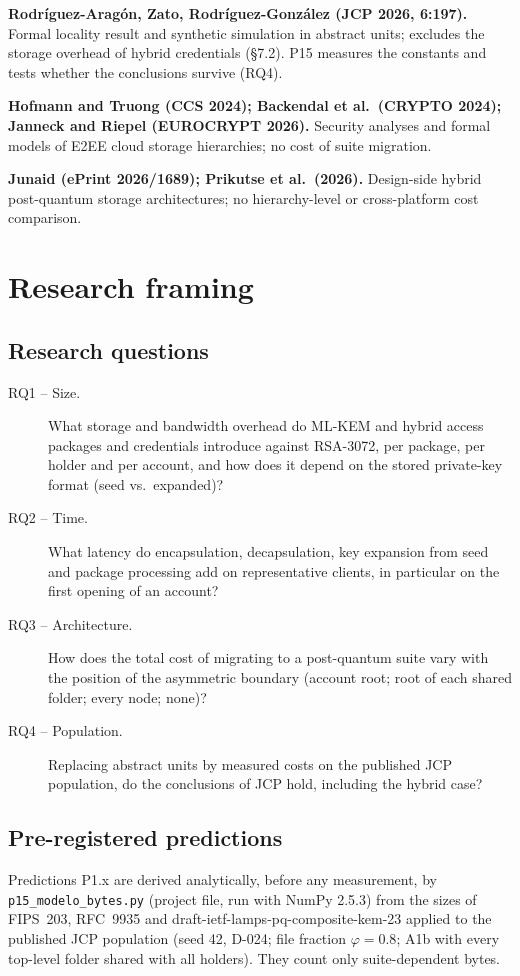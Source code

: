 \documentclass[11pt,a4paper]{article}
\begin{document}
\textbf{Rodríguez-Aragón, Zato, Rodríguez-González (JCP 2026, 6:197).} Formal locality result and synthetic simulation in abstract units; excludes the storage overhead of hybrid credentials (\S7.2). P15 measures the constants and tests whether the conclusions survive (RQ4).

\textbf{Hofmann and Truong (CCS 2024); Backendal et al.\ (CRYPTO 2024); Janneck and Riepel (EUROCRYPT 2026).} Security analyses and formal models of E2EE cloud storage hierarchies; no cost of suite migration.

\textbf{Junaid (ePrint 2026/1689); Prikutse et al.\ (2026).} Design-side hybrid post-quantum storage architectures; no hierarchy-level or cross-platform cost comparison.

\section{Research framing}
\subsection{Research questions}
\begin{description}
\item[RQ1 -- Size.] What storage and bandwidth overhead do ML-KEM and hybrid access packages and credentials introduce against RSA-3072, per package, per holder and per account, and how does it depend on the stored private-key format (seed vs.\ expanded)?
\item[RQ2 -- Time.] What latency do encapsulation, decapsulation, key expansion from seed and package processing add on representative clients, in particular on the first opening of an account?
\item[RQ3 -- Architecture.] How does the total cost of migrating to a post-quantum suite vary with the position of the asymmetric boundary (account root; root of each shared folder; every node; none)?
\item[RQ4 -- Population.] Replacing abstract units by measured costs on the published JCP population, do the conclusions of JCP hold, including the hybrid case?
\end{description}

\subsection{Pre-registered predictions}\label{sec:predictions}
Predictions P1.x are derived analytically, before any measurement, by \texttt{p15\_\allowbreak{}modelo\_\allowbreak{}bytes.py} (project file, run with NumPy 2.5.3) from the sizes of FIPS~203, RFC~9935 and draft-ietf-lamps-pq-composite-kem-23 applied to the published JCP population (seed 42, D-024; file fraction $\varphi=0.8$; A1b with every top-level folder shared with all holders). They count only suite-dependent bytes.
\end{document}
